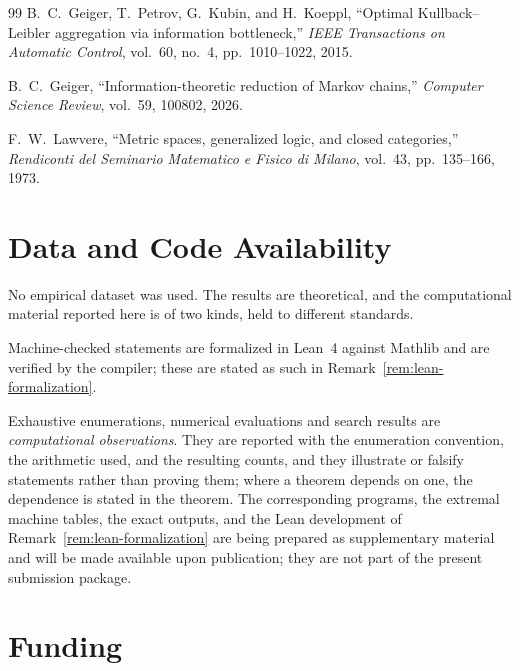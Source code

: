 \documentclass[12pt]{article}
\theoremstyle{definition}
\begin{document}
\begin{thebibliography}{99}
B.~C.~Geiger, T.~Petrov, G.~Kubin, and H.~Koeppl,
``Optimal Kullback--Leibler aggregation via information bottleneck,''
\emph{IEEE Transactions on Automatic Control},
vol.~60, no.~4, pp.~1010--1022, 2015.

B.~C.~Geiger,
``Information-theoretic reduction of Markov chains,''
\emph{Computer Science Review}, vol.~59, 100802, 2026.

F.~W.~Lawvere,
``Metric spaces, generalized logic, and closed categories,''
\emph{Rendiconti del Seminario Matematico e Fisico di Milano},
vol.~43, pp.~135--166, 1973.

\end{thebibliography}

\section*{Data and Code Availability}

No empirical dataset was used.  The results are theoretical, and the
computational material reported here is of two kinds, held to different
standards.

Machine-checked statements are formalized in Lean~4 against Mathlib and are
verified by the compiler; these are stated as such in
Remark~\ref{rem:lean-formalization}.

Exhaustive enumerations, numerical evaluations and search results are
\emph{computational observations}.  They are reported with the enumeration
convention, the arithmetic used, and the resulting counts, and they illustrate
or falsify statements rather than proving them; where a theorem depends on one,
the dependence is stated in the theorem.  The corresponding programs, the
extremal machine tables, the exact outputs, and the Lean development of
Remark~\ref{rem:lean-formalization} are being prepared as supplementary
material and will be made available upon publication; they are not part of
the present submission package.

\section*{Funding}
\end{document}
